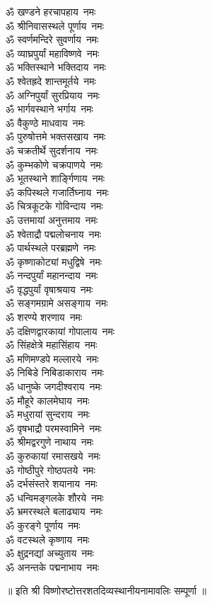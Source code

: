 \begin{multicols}{2}
\begin{flushleft}
ॐ खण्डने हरचापहाय~नमः\\
ॐ श्रीनिवासस्थले पूर्णाय~नमः\\
ॐ स्वर्णमन्दिरे सुवर्णाय~नमः\\
ॐ व्याघ्रपुर्यां महाविष्णवे~नमः\\
ॐ भक्तिस्थाने भक्तिदाय~नमः\\
ॐ श्वेतह्रदे शान्तमूर्तये~नमः\\
ॐ अग्निपुर्यां सुरप्रियाय~नमः\\
ॐ भार्गवस्थाने भर्गाय~नमः\\
ॐ वैकुण्ठे माधवाय~नमः\hfill{}\\
ॐ पुरुषोत्तमे भक्तसखाय~नमः\\
ॐ चक्रतीर्थे सुदर्शनाय~नमः\\
ॐ कुम्भकोणे चक्रपाणये~नमः\\
ॐ भूतस्थाने शार्ङ्गिणाय~नमः\\
ॐ कपिस्थले गजार्तिघ्नाय~नमः\\
ॐ चित्रकूटके गोविन्दाय~नमः\\
ॐ उत्तमायां अनुत्तमाय~नमः\\
ॐ श्वेताद्रौ पद्मलोचनाय~नमः\\
ॐ पार्थस्थले परब्रह्मणे~नमः\\
ॐ कृष्णाकोट्यां मधुद्विषे~नमः\hfill{}\\
ॐ नन्दपुर्यां महानन्दाय~नमः\\
ॐ वृद्धपुर्यां वृषाश्रयाय~नमः\\
ॐ सङ्गमग्रामे असङ्गाय~नमः\\
ॐ शरण्ये शरणाय~नमः\\
ॐ दक्षिणद्वारकायां गोपालाय~नमः\\
ॐ सिंहक्षेत्रे महासिंहाय~नमः\\
ॐ मणिमण्डपे मल्लारये~नमः\\
ॐ निबिडे निबिडाकाराय~नमः\\
ॐ धानुष्के जगदीश्वराय~नमः\\
ॐ मौहूरे कालमेघाय~नमः\hfill{}\\
ॐ मधुरायां सुन्दराय~नमः\\
ॐ वृषभाद्रौ परमस्वामिने~नमः\\
ॐ श्रीमद्वरगुणे नाथाय~नमः\\
ॐ कुरुकायां रमासखये~नमः\\
ॐ गोष्ठीपुरे गोष्ठपतये~नमः\\
ॐ दर्भसंस्तरे शयानाय~नमः\\
ॐ धन्विमङ्गलके शौरये~नमः\\
ॐ भ्रमरस्थले बलाढ्याय~नमः\\
ॐ कुरङ्गे पूर्णाय~नमः\\
ॐ वटस्थले कृष्णाय~नमः\hfill{}\\
ॐ क्षुद्रनद्यां अच्युताय~नमः\\
ॐ अनन्तके पद्मनाभाय~नमः\\
\end{flushleft}
\end{multicols}
\centerline{॥ इति श्री विष्णोरष्टोत्तरशतदिव्यस्थानीयनामावलिः सम्पूर्णा ॥}
